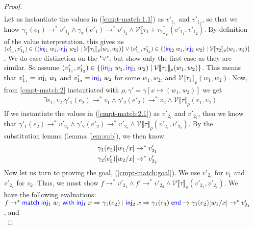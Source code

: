\documentclass[a4paper, 11pt]{report}
\theoremstyle{definition}
\newcommand{\Keyword}[1]{{\color{blue} \mathsf{#1}}}
\newcommand{\var}{x}
\newcommand{\expr}{e}
\newcommand{\val}{v}
\newcommand{\valB}{w}
\newcommand{\Inj}[1]{\Keyword{inj}_{#1}\;}
\newcommand{\MatchCmd}{\Keyword{match}}
\newcommand{\WithCmd}{\Keyword{with}}
\newcommand{\EndCmd}{\Keyword{end}}
\def\Match#1with#2=>#3|#4=>#5end{\MatchCmd{}\;#1\;\WithCmd{}\;#2\Rightarrow#3 \;|\;#4\Rightarrow#5\;\EndCmd{}}
\newcommand{\subst}[3]{#1{\left[#3 \middle/ #2 \right]}}
\newcommand{\Tsum}[2]{#1 + #2}
\newcommand{\typ}{\tau}
\newcommand{\step}{\rightarrow}
\newcommand{\stepS}{\rightarrow^*}
\newcommand{\ValInp}[2]{\mathcal{V} \llbracket #1 \rrbracket_{#2}}
\newcommand{\map}[2]{#1 \mapsto #2}
\begin{document}
\begin{proof}
\begin{align}
  \end{align}
  Let us instantiate the values in (\ref*{cmpt-match:1.1}) as $\val'_{1_1}$ and $\val'_{1_2}$, so that we know $\gamma_1(\expr_1) \stepS \val'_{1_1} \land \gamma_2(\expr'_1) \stepS \val'_{1_2} \land \ValInp{\Tsum{\typ_1}{\typ_2}}{\rho}(\val'_{1_1}, \val'_{1_2})$. By definition of the value interpretation, this gives us
  $(\val'_{1_1}, \val'_{1_2}) \in \{(\Inj{1} \valB_1, \Inj{1} \valB_2) \mid \ValInp{\typ_1}{\rho}(\valB_1, \valB_2)\} \lor\\
  (\val'_{1_1}, \val'_{1_2}) \in \{(\Inj{2} \valB_1, \Inj{2} \valB_2) \mid \ValInp{\typ_2}{\rho}(\valB_1, \valB_2)\}$. We do case distinction on the "$\lor$", but show only the first case as they are similar. So assume 
  $(\val'_{1_1}, \val'_{1_2}) \in \{(\Inj{1} \valB_1, \Inj{1} \valB_2) \mid \ValInp{\typ_1}{\rho}(\valB_1, \valB_2)\}$. This means that $\val'_{1_1} = \Inj{1} \valB_1$ and $\val'_{1_2} = \Inj{1} \valB_2$ for some $\valB_1, \valB_2$, and $\ValInp{\typ_1}{\rho}(\valB_1, \valB_2)$.
  Now, from \ref{cmpt-match:2} instantiated with $\rho, \gamma' = \gamma[\map{\var}{(\valB_1, \valB_2)}]$ we get
  \begin{align}
    &\exists \val_1, \val_2 . \gamma'_1(\expr_2) \stepS \val_1 \land \gamma'_2(\expr'_2) \stepS \val_2 \land \ValInp{\typ}{\rho}(\val_1, \val_2)\label{cmpt-match:2.1}
  \end{align}
  If we instantiate the values in (\ref*{cmpt-match:2.1}) as $\val'_{2_1}$ and $\val'_{2_2}$, then we know that $\gamma'_1(\expr_2) \stepS \val'_{2_1} \land \gamma'_2(\expr'_2) \stepS \val'_{2_2} \land \ValInp{\typ}{\rho}(\val'_{2_1}, \val'_{2_2})$. By the substitution lemma (lemma \ref{lem:sub}), we then know:
  \begin{align}
    &\subst{\gamma_1(\expr_2)}{\var}{\valB_1} \stepS \val'_{2_1}\label{cmpt-match:sub.1}\\
    &\subst{\gamma_2(\expr'_2)}{\var}{\valB_2} \stepS \val'_{2_2}\label{cmpt-match:sub.2}
  \end{align}
  Now let us turn to proving the goal, (\ref*{cmpt-match:goal}). We use $\val'_{2_1}$ for $\val_1$ and $\val'_{2_2}$ for $\val_2$. Thus, we must show 
  $f \stepS \val'_{2_1} \land f' \stepS \val'_{2_2} \land \ValInp{\typ}{\rho}(\val'_{2_1}, \val'_{2_2})$. We have the following evaluations:\\
  $f \stepS \Match \Inj{1} \valB_1 with \Inj{1} \var => \gamma_1(\expr_2) | \Inj{2} \var => \gamma_1(\expr_3) end \step \subst{\gamma_1(\expr_2)}{\var}{\valB_1} \stepS \val'_{2_1}$, and\\

\end{proof}
\end{document}

